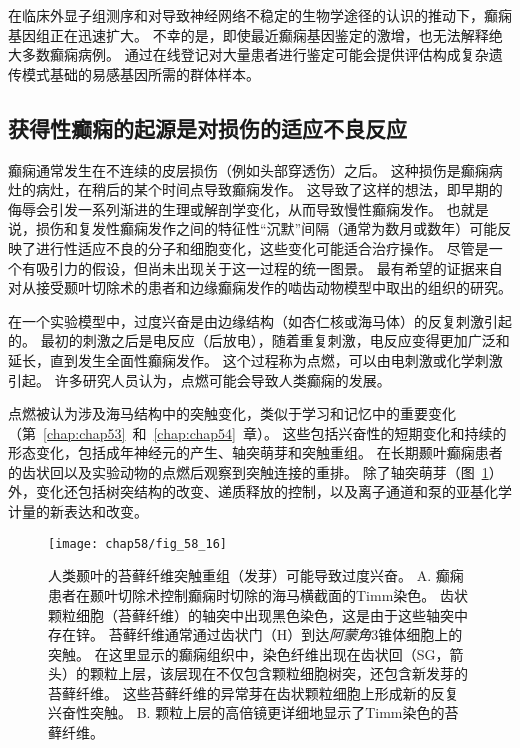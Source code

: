 在临床外显子组测序和对导致神经网络不稳定的生物学途径的认识的推动下，癫痫基因组正在迅速扩大。
不幸的是，即使最近癫痫基因鉴定的激增，也无法解释绝大多数癫痫病例。
通过在线登记对大量患者进行鉴定可能会提供评估构成复杂遗传模式基础的易感基因所需的群体样本。



\subsection{获得性癫痫的起源是对损伤的适应不良反应}

癫痫通常发生在不连续的皮层损伤（例如头部穿透伤）之后。
这种损伤是癫痫病灶的病灶，在稍后的某个时间点导致癫痫发作。
这导致了这样的想法，即早期的侮辱会引发一系列渐进的生理或解剖学变化，从而导致慢性癫痫发作。
也就是说，损伤和复发性癫痫发作之间的特征性“沉默”间隔（通常为数月或数年）可能反映了进行性适应不良的分子和细胞变化，这些变化可能适合治疗操作。
尽管是一个有吸引力的假设，但尚未出现关于这一过程的统一图景。
最有希望的证据来自对从接受颞叶切除术的患者和边缘癫痫发作的啮齿动物模型中取出的组织的研究。


在一个实验模型中，过度兴奋是由边缘结构（如杏仁核或海马体）的反复刺激引起的。
最初的刺激之后是电反应（后放电），随着重复刺激，电反应变得更加广泛和延长，直到发生全面性癫痫发作。
这个过程称为点燃，可以由电刺激或化学刺激引起。
许多研究人员认为，点燃可能会导致人类癫痫的发展。


点燃被认为涉及海马结构中的突触变化，类似于学习和记忆中的重要变化（第~\ref{chap:chap53}~和~\ref{chap:chap54}~章）。
这些包括兴奋性的短期变化和持续的形态变化，包括成年神经元的产生、轴突萌芽和突触重组。
在长期颞叶癫痫患者的齿状回以及实验动物的点燃后观察到突触连接的重排。
除了轴突萌芽（图~\ref{fig:58_16}）外，变化还包括树突结构的改变、递质释放的控制，以及离子通道和泵的亚基化学计量的新表达和改变。


\begin{figure}[htbp]
	\centering
	\texttt{[image: chap58/fig\_58\_16]}
	\caption{人类颞叶的苔藓纤维突触重组（发芽）可能导致过度兴奋\cite{sutula1989mossy}。
		A. 癫痫患者在颞叶切除术控制癫痫时切除的海马横截面的Timm染色。
		齿状颗粒细胞（苔藓纤维）的轴突中出现黑色染色，这是由于这些轴突中存在锌。
		苔藓纤维通常通过齿状门（H）到达\textit{阿蒙角}3锥体细胞上的突触。
		在这里显示的癫痫组织中，染色纤维出现在齿状回（SG，箭头）的颗粒上层，该层现在不仅包含颗粒细胞树突，还包含新发芽的苔藓纤维。
		这些苔藓纤维的异常芽在齿状颗粒细胞上形成新的反复兴奋性突触。
		B. 颗粒上层的高倍镜更详细地显示了Timm染色的苔藓纤维。}
	\label{fig:58_16}
\end{figure}


